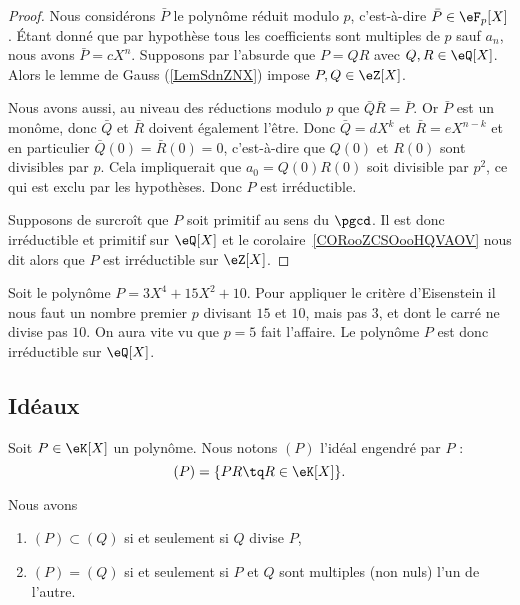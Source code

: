 \begin{proof}
	Nous considérons \( \bar P\) le polynôme réduit modulo \( p\), c'est-à-dire \( \bar P\in \eF_p[X]\). Étant donné que par hypothèse tous les coefficients sont multiples de \( p\) sauf \( a_n\), nous avons \( \bar P=cX^n\). Supposons par l'absurde que \( P=QR\) avec \( Q,R\in \eQ[X]\). Alors le lemme de Gauss (\ref{LemSdnZNX}) impose \( P,Q\in \eZ[X]\).

	Nous avons aussi, au niveau des réductions modulo \( p\) que \( \bar Q\bar R=\bar P\). Or \( \bar P\) est un monôme, donc \( \bar Q\) et \( \bar R\) doivent également l'être. Donc \( \bar Q=dX^k\) et \( \bar R=eX^{n-k}\) et en particulier \( \bar Q(0)=\bar R(0)=0\), c'est-à-dire que \( Q(0)\) et \( R(0)\) sont divisibles par \( p\). Cela impliquerait que \( a_0=Q(0)R(0)\) soit divisible par \( p^2\), ce qui est exclu par les hypothèses. Donc \( P\) est irréductible.

	Supposons de surcroît que \( P\) soit primitif au sens du \( \pgcd\). Il est donc irréductible et primitif sur \( \eQ[X]\) et le corolaire~\ref{CORooZCSOooHQVAOV} nous dit alors que \( P\) est irréductible sur \( \eZ[X]\).
\end{proof}

\begin{example}
	Soit le polynôme \( P=3X^4+15 X^2+10\). Pour appliquer le critère d'Eisenstein il nous faut un nombre premier \( p\) divisant \( 15\) et \( 10\), mais pas \( 3\), et dont le carré ne divise pas \( 10\). On aura vite vu que \( p=5\) fait l'affaire. Le polynôme \( P\) est donc irréductible sur \( \eQ[X]\).
\end{example}

\subsection{Idéaux}

Soit \( P\in \eK[X]\) un polynôme. Nous notons \( (P)\) l'idéal engendré par \( P\) :
\begin{equation}        \label{EqDefxMkDtW}
	(P)=\{ PR\tq R\in\eK[X] \}.
\end{equation}

\begin{lemma}
	Nous avons
	\begin{enumerate}
		\item
		      \( (P)\subset (Q)\) si et seulement si \( Q\) divise \( P\),
		\item
		      \( (P)=(Q)\) si et seulement si \( P\) et \( Q\) sont multiples (non nuls) l'un de l'autre.
	\end{enumerate}
\end{lemma}

